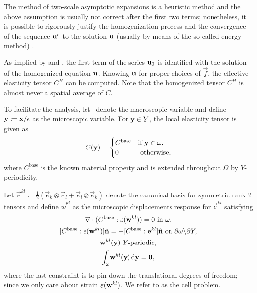 \documentclass[twocolumn,10pt]{article}
\begin{document}
The method of two-scale asymptotic expansions is a heuristic method
and the above assumption is usually not correct after the first two
terms; nonetheless, it is possible to rigorously justify the
homogenization process and the convergence of the sequence $\mathbf u^\epsilon$ to
the solution $\mathbf u$ (usually by means of the so-called energy method)
\cite{allaire2002shape, allaire1992homogenization}.

As implied by  and , the
first term of the series $\mathbf u_0$ is identified with the solution of the
homogenized equation $\mathbf u$. Knowing $\mathbf u$ for proper choices of
$\vec{f}$, the effective elasticity tensor $C^H$ can be computed. Note
that the homogenized tensor $C^H$ is almost never a spatial average of
$C$.

To facilitate the analysis, let \x\ denote the macroscopic variable
and define $\mathbf y\coloneqq \mathbf x/\epsilon$ as the microscopic variable. For ${\mathbf y}
\in Y$, the local elasticity tensor is given as
\begin{equation}
  \label{eqn:microC}
  C(\mathbf y) = \begin{cases} C^\text{base} & \text{if } \mathbf y
    \in \omega, \\ 0 & \text{ otherwise,} \end{cases}
\end{equation}
where $C^\text{base}$ is the known material property and is extended
throughout $\Omega$ by $Y$-periodicity.

Let $\vec{e}^{kl} \coloneqq \frac{1}{2} \left(\vec{e}_k \otimes
\vec{e}_l + \vec{e}_l \otimes \vec{e}_k \right)$ denote the canonical
basis for symmetric rank 2 tensors and define $\vec{w}^{kl}$ as the
microscopic displacements response for $\vec{e}^{kl}$ satisfying
\begin{subequations}
  \label{set:cell}
  \begin{gather}
    \nabla \cdot (C^\text{base} : \strain({\bf w}^{kl})) = 0 \text{ in } \omega, \\
    [C^\text{base} : \strain({\bf w}^{kl})]\hat{\vec{n}}  =  - [C^\text{base} : \vec{e}^{kl}]\hat{\vec{n}} \text{ on } \partial \omega \backslash \partial Y, \\
    {\bf w}^{kl}({\y})\ Y\text{-periodic}, \\
    \int_\omega \! {\bf w}^{kl}({\y})  \, \mathrm{d} {\y} =  {\bf 0},
  \end{gather}
\end{subequations}
where the last constraint is to pin down the translational degrees of
freedom; since we only care about strain $\varepsilon(\mathbf w^{kl})$.  We
refer to  as the cell problem.
\end{document}

